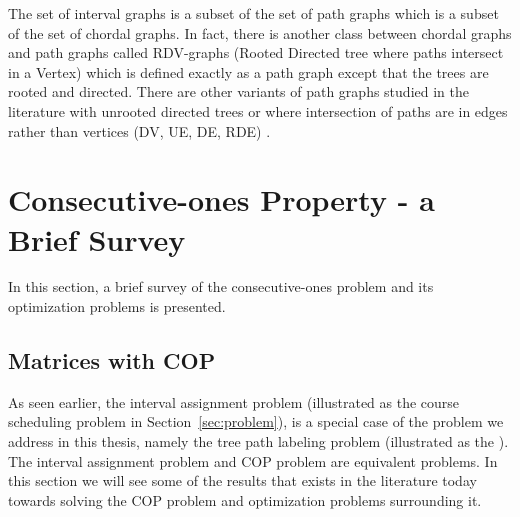 The set of interval graphs is a subset of the set of path graphs which
is a subset of the set of chordal graphs. In fact, there is another
class between chordal graphs and path graphs called RDV-graphs (Rooted
Directed tree where paths intersect in a Vertex) \cite{mw86} which is
defined exactly as a path graph except that the trees are rooted and
directed. There are other variants of path graphs studied in the
literature with unrooted directed trees or where intersection of paths
are in edges rather than vertices (DV, UE, DE, RDE) \cite{gm03}.


\section[Brief Survey]{Consecutive-ones Property - a Brief Survey}
\label{sec:background}

In this section, a brief survey of the consecutive-ones problem and
its optimization problems is presented.


\subsection{Matrices with COP}
\label{sec:copmatrices}
As seen earlier, the interval assignment problem (illustrated as the
course scheduling problem in Section~\ref{sec:problem}), is a special
case of the problem we address in this thesis, namely the tree path
labeling problem (illustrated as the \illustrationproblem). The
interval assignment problem and COP problem are equivalent
problems. In this section we will see some of the results that exists
in the literature today towards solving the COP problem and
optimization problems surrounding it.


